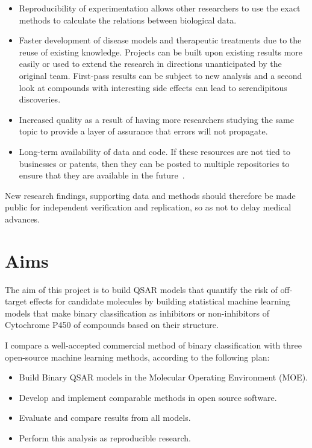 \begin{itemize}

\item Reproducibility of experimentation allows other researchers to use the exact methods to calculate the relations between biological data.

\item Faster development of disease models and therapeutic treatments due to the reuse of existing knowledge. Projects can be built upon existing results more easily or used to extend the research in directions unanticipated by the original team. First-pass results can be subject to new analysis and a second look at compounds with interesting side effects can lead to serendipitous discoveries.

\item Increased quality as a result of having more researchers studying the same topic to provide a layer of assurance that errors will not propagate.

\item Long-term availability of data and code. If these resources are not tied to businesses or patents, then they can be posted to multiple repositories to ensure that they are available in the future~\cite{Prlic2012}.

\end{itemize}

New research findings, supporting data and methods should therefore be made public for independent verification and replication, so as not to delay medical advances.

\pagebreak

\section{Aims}
The aim of this project is to build QSAR models that quantify the risk of off-target effects for candidate molecules by building statistical machine learning models that make binary classification as inhibitors or non-inhibitors of Cytochrome P450 of compounds based on their structure.

I compare a well-accepted commercial method of binary classification with three open-source machine learning methods, according to the following plan:

\begin{itemize}

\item Build Binary QSAR models in the Molecular Operating Environment (MOE).

\item Develop and implement comparable methods in open source software.

\item Evaluate and compare results from all models.

\item Perform this analysis as reproducible research.

\end{itemize}
